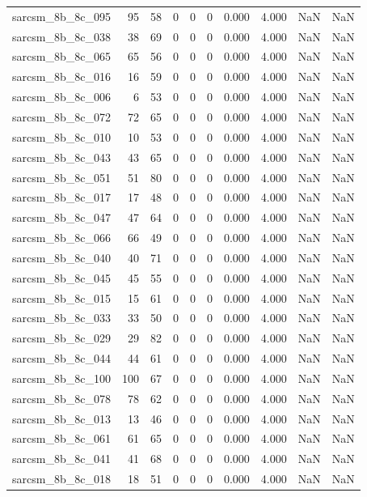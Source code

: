 \documentclass{article}
\begin{document}
\begin{longtable}{lrrrrrrrrr}
sarcsm\_8b\_8c\_095 & 95 & 58 & 0 & 0 & 0 & 0.000 & 4.000 & NaN & NaN \\
sarcsm\_8b\_8c\_038 & 38 & 69 & 0 & 0 & 0 & 0.000 & 4.000 & NaN & NaN \\
sarcsm\_8b\_8c\_065 & 65 & 56 & 0 & 0 & 0 & 0.000 & 4.000 & NaN & NaN \\
sarcsm\_8b\_8c\_016 & 16 & 59 & 0 & 0 & 0 & 0.000 & 4.000 & NaN & NaN \\
sarcsm\_8b\_8c\_006 & 6 & 53 & 0 & 0 & 0 & 0.000 & 4.000 & NaN & NaN \\
sarcsm\_8b\_8c\_072 & 72 & 65 & 0 & 0 & 0 & 0.000 & 4.000 & NaN & NaN \\
sarcsm\_8b\_8c\_010 & 10 & 53 & 0 & 0 & 0 & 0.000 & 4.000 & NaN & NaN \\
sarcsm\_8b\_8c\_043 & 43 & 65 & 0 & 0 & 0 & 0.000 & 4.000 & NaN & NaN \\
sarcsm\_8b\_8c\_051 & 51 & 80 & 0 & 0 & 0 & 0.000 & 4.000 & NaN & NaN \\
sarcsm\_8b\_8c\_017 & 17 & 48 & 0 & 0 & 0 & 0.000 & 4.000 & NaN & NaN \\
sarcsm\_8b\_8c\_047 & 47 & 64 & 0 & 0 & 0 & 0.000 & 4.000 & NaN & NaN \\
sarcsm\_8b\_8c\_066 & 66 & 49 & 0 & 0 & 0 & 0.000 & 4.000 & NaN & NaN \\
sarcsm\_8b\_8c\_040 & 40 & 71 & 0 & 0 & 0 & 0.000 & 4.000 & NaN & NaN \\
sarcsm\_8b\_8c\_045 & 45 & 55 & 0 & 0 & 0 & 0.000 & 4.000 & NaN & NaN \\
sarcsm\_8b\_8c\_015 & 15 & 61 & 0 & 0 & 0 & 0.000 & 4.000 & NaN & NaN \\
sarcsm\_8b\_8c\_033 & 33 & 50 & 0 & 0 & 0 & 0.000 & 4.000 & NaN & NaN \\
sarcsm\_8b\_8c\_029 & 29 & 82 & 0 & 0 & 0 & 0.000 & 4.000 & NaN & NaN \\
sarcsm\_8b\_8c\_044 & 44 & 61 & 0 & 0 & 0 & 0.000 & 4.000 & NaN & NaN \\
sarcsm\_8b\_8c\_100 & 100 & 67 & 0 & 0 & 0 & 0.000 & 4.000 & NaN & NaN \\
sarcsm\_8b\_8c\_078 & 78 & 62 & 0 & 0 & 0 & 0.000 & 4.000 & NaN & NaN \\
sarcsm\_8b\_8c\_013 & 13 & 46 & 0 & 0 & 0 & 0.000 & 4.000 & NaN & NaN \\
sarcsm\_8b\_8c\_061 & 61 & 65 & 0 & 0 & 0 & 0.000 & 4.000 & NaN & NaN \\
sarcsm\_8b\_8c\_041 & 41 & 68 & 0 & 0 & 0 & 0.000 & 4.000 & NaN & NaN \\
sarcsm\_8b\_8c\_018 & 18 & 51 & 0 & 0 & 0 & 0.000 & 4.000 & NaN & NaN \\

\end{longtable}
\end{document}
